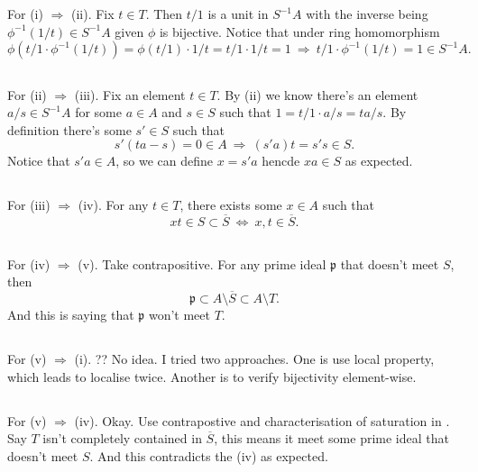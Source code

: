 For (i) $\Rightarrow$ (ii). Fix $t\in T$. Then $t/1$ is a unit in $S^{-1}A$ with the inverse being $\phi^{-1}(1/t)\in S^{-1}A$ given $\phi$ is bijective. 
Notice that under ring homomorphism 
\[\phi(t/1\cdot\phi^{-1}(1/t))=\phi(t/1)\cdot 1/t=t/1\cdot 1/t=1 ~\Rightarrow~ t/1\cdot\phi^{-1}(1/t)=1\in S^{-1}A.\]

\subsection{}

For (ii) $\Rightarrow$ (iii). Fix an element $t\in T$. By (ii) we know there's an element $a/s\in S^{-1}A$ for some $a\in A$ and $s\in S$ such that $1=t/1\cdot a/s=ta/s$. By definition there's some $s'\in S$ such that \[s'(ta-s)=0\in A ~\Rightarrow~ (s'a)t=s's\in S.\] Notice that $s'a\in A$, so we can define $x=s'a$ hencde $xa\in S$ as expected. 

\subsection{}\label{Atiyah Chapter 3 Ex 8. 3-4}

For (iii) $\Rightarrow$ (iv). For any $t\in T$, there exists some $x\in A$ such that 
\[xt\in S\subset \overline{S} ~\Leftrightarrow~ x,t\in\overline{S}.\]

\subsection{}

For (iv) $\Rightarrow$ (v). Take contrapositive. For any prime ideal $\mathfrak p$ that doesn't meet $S$, then \[\mathfrak p\subset A\setminus \overline{S}\subset A\setminus T.\] And this is saying that $\mathfrak p$ won't meet $T$.

\subsection{}

For (v) $\Rightarrow$ (i). 
?? No idea. I tried two approaches. One is use local property, which leads to localise twice. Another is to verify bijectivity element-wise.

\subsection{}

For (v) $\Rightarrow$ (iv). Okay. Use contrapostive and characterisation of saturation in . Say $T$ isn't completely contained in $\overline{S}$, this means it meet some prime ideal that doesn't meet $S$. And this contradicts the (iv) as expected.

